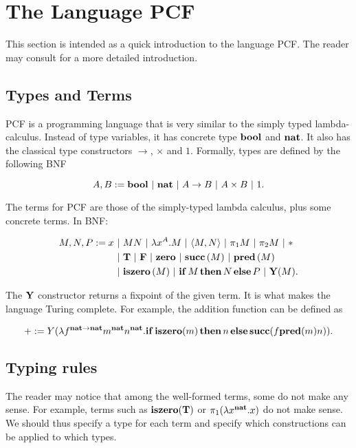 
\section{The Language PCF}

This section is intended as a quick introduction to the language PCF. The reader may consult \cite{LambdaNotes} for a more detailed introduction.

\subsection{Types and Terms}

PCF is a programming language that is very similar to the simply typed lambda-calculus. Instead of type variables, it has concrete type $\mathbf{bool}$ and $\mathbf{nat}$. It also has the classical type constructors $\to$, $\times$ and $1$. Formally, types are defined by the following BNF

\[ A, B := \mathbf{bool} \ \mathbf{|}\  \mathbf{nat} \ \mathbf{|}\  A\to B \ \mathbf{|}\  A\times B \ \mathbf{|}\  1. \]

The terms for PCF are those of the simply-typed lambda calculus, plus some concrete terms. In BNF:

\begin{align*}
    M, N, P := x &\ \mathbf{|}\  MN \ \mathbf{|}\  \lambda x^A.M \ \mathbf{|}\  \langle M, N\rangle \ \mathbf{|}\  \pi_1M \ \mathbf{|}\  \pi_2M \ \mathbf{|}\  * \\
    &\ \mathbf{|}\  \mathbf{T} \ \mathbf{|}\  \mathbf{F} \ \mathbf{|}\  \mathbf{zero} \ \mathbf{|}\  \mathbf{succ}\,(M) \ \mathbf{|}\  \mathbf{pred}\,(M) \\
    &\ \mathbf{|}\  \mathbf{iszero}\,(M) \ \mathbf{|}\  \mathbf{if}\,M\,\mathbf{then}\,N\,\mathbf{else}\,P \ \mathbf{|}\  \mathbf{Y}(M).
\end{align*}

The $\mathbf{Y}$ constructor returns a fixpoint of the given term. It is what makes the language Turing complete. For example, the addition function can be defined as

\[ + := Y(\lambda f^{\mathbf{nat}\to\mathbf{nat}}m^\mathbf{nat}n^\mathbf{nat}.\mathbf{if}\,\mathbf{iszero}(m)\,\mathbf{then}\,n\,\mathbf{else}\,\mathbf{succ}(f \mathbf{pred}(m) n)). \]

\subsection{Typing rules}

The reader may notice that among the well-formed terms, some do not make any sense. For example, terms such as $\mathbf{iszero}(\mathbf{T})$ or $\pi_1(\lambda x^\mathbf{nat}.x)$ do not make sense. We should thus specify a type for each term and specify which constructions can be applied to which types.


